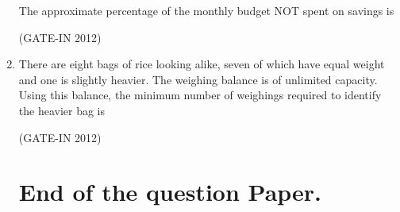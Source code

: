 \documentclass[journal,12pt,onecolumn]{IEEEtran}
\theoremstyle{remark}
\begin{document}
\begin{enumerate}
The approximate percentage of the monthly budget NOT spent on savings is

\hfill{(GATE-IN 2012)}
\begin{enumerate}
\end{enumerate}

\item There are eight bags of rice looking alike, seven of which have equal weight and one is slightly heavier. The weighing balance is of unlimited capacity. Using this balance, the minimum number of weighings required to identify the heavier bag is

\hfill{(GATE-IN 2012)}
\begin{enumerate}
\end{enumerate}

\section*{End of the question Paper.}

\end{enumerate}
\end{document}
